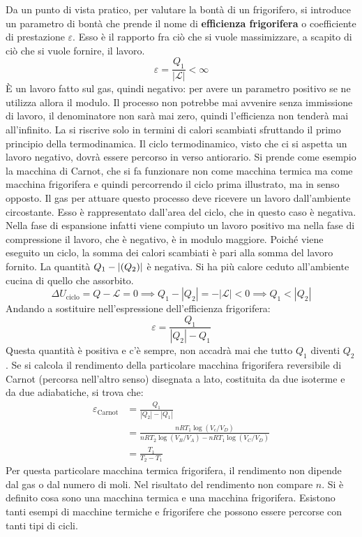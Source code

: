\documentclass[10pt,a4paper]{book}
\DeclarePairedDelimiter{\abs}{\lvert}{\rvert} %
\begin{document}
\FloatBarrier
Da un punto di vista pratico, per valutare la bontà di un frigorifero, si introduce un parametro di bontà che prende il nome di \textbf{efficienza frigorifera} o coefficiente di prestazione $\varepsilon$. Esso è il rapporto fra ciò che si vuole massimizzare, a scapito di ciò che si vuole fornire, il lavoro.
\[
	\varepsilon = \frac{Q_1 }{|\mathcal{L} |} < \infty
\]
È un lavoro fatto sul gas, quindi negativo: per avere un parametro positivo se ne utilizza allora il modulo.
Il processo non potrebbe mai avvenire senza immissione di lavoro, il denominatore non sarà mai zero, quindi l'efficienza non tenderà mai all'infinito. La si riscrive solo in termini di calori scambiati sfruttando il primo principio della termodinamica. Il ciclo termodinamico, visto che ci si aspetta un lavoro negativo, dovrà essere percorso in verso antiorario.
Si prende come esempio la macchina di Carnot, che si fa funzionare non come macchina termica ma come macchina frigorifera e quindi percorrendo il ciclo prima illustrato, ma in senso opposto.
Il gas per attuare questo processo deve ricevere un lavoro dall'ambiente circostante. Esso è rappresentato dall'area del ciclo, che in questo caso è negativa. Nella fase di espansione infatti viene compiuto un lavoro positivo ma nella fase di compressione il lavoro, che è negativo, è in modulo maggiore.
Poiché viene eseguito un ciclo, la somma dei calori scambiati è pari alla somma del lavoro fornito. La quantità $Q_1 - \abs{(Q_2)}$ è negativa. Si ha più calore ceduto all'ambiente cucina di quello che assorbito.
\[
	\Delta U_{\text{ciclo} } = Q - \mathcal{L}  = 0 \implies Q_1-|Q_2| = -|\mathcal{L}| < 0 \implies Q_1 < |Q_2|
\]
Andando a sostituire nell'espressione dell'efficienza frigorifera:
\[
	\varepsilon = \frac{Q_1 }{|Q_2| - Q_1 }
\]
Questa quantità è positiva e c'è sempre, non accadrà mai che tutto $Q_1$ diventi $Q_2$. Se si calcola il rendimento della particolare macchina frigorifera reversibile di Carnot (percorsa nell'altro senso) disegnata a lato, costituita da due isoterme e da due adiabatiche, si trova che:
\begin{align*}
	\varepsilon_{\text{Carnot} } &= \frac{Q_1 }{|Q_2| - |Q_1|} \\
	&= \frac{nRT_1\log (V_c/V_D  ) }{nRT_2\log (V_B/V_A) - nRT_1\log (V_C/V_D)} \\
	&=\frac{T_1 }{T_2-T_1  }
\end{align*}
Per questa particolare macchina termica frigorifera, il rendimento non dipende dal gas o dal numero di moli. Nel risultato del rendimento non compare $n$. Si è definito cosa sono una macchina termica e una macchina frigorifera. Esistono tanti esempi di macchine termiche e frigorifere che possono essere percorse con tanti tipi di cicli.
\end{document}
